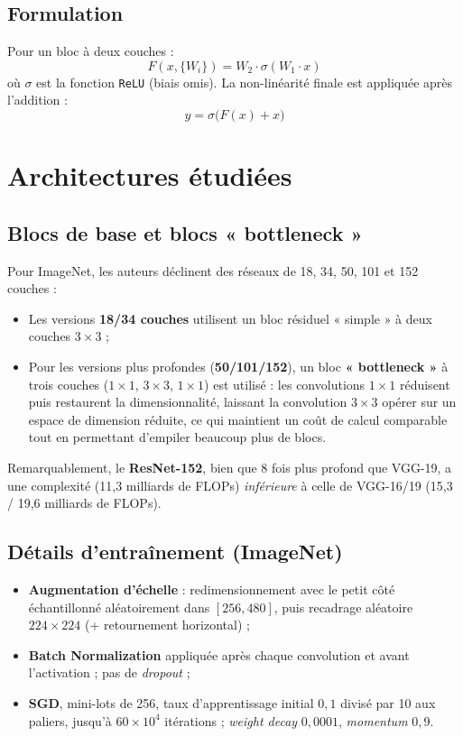 \documentclass[a4paper,11pt]{article}
\begin{document}
\subsection{Formulation}
Pour un bloc à deux couches :
$$F(x, \{W_i\}) = W_2 \cdot \sigma(W_1 \cdot x)$$
où $\sigma$ est la fonction \texttt{ReLU} (biais omis). La non-linéarité finale est appliquée après l'addition :
$$y = \sigma\big(F(x) + x\big)$$

\section{Architectures étudiées}

\subsection{Blocs de base et blocs « bottleneck »}
Pour ImageNet, les auteurs déclinent des réseaux de 18, 34, 50, 101 et 152 couches :
\begin{itemize}
    \item Les versions \textbf{18/34 couches} utilisent un bloc résiduel « simple » à deux couches $3\times 3$ ;
    \item Pour les versions plus profondes (\textbf{50/101/152}), un bloc \textbf{« bottleneck »} à trois couches ($1\times1$, $3\times3$, $1\times1$) est utilisé : les convolutions $1\times1$ réduisent puis restaurent la dimensionnalité, laissant la convolution $3\times3$ opérer sur un espace de dimension réduite, ce qui maintient un coût de calcul comparable tout en permettant d'empiler beaucoup plus de blocs.
\end{itemize}

Remarquablement, le \textbf{ResNet-152}, bien que 8 fois plus profond que VGG-19, a une complexité (11,3 milliards de FLOPs) \emph{inférieure} à celle de VGG-16/19 (15,3 / 19,6 milliards de FLOPs).

\subsection{Détails d'entraînement (ImageNet)}
\begin{itemize}
    \item \textbf{Augmentation d'échelle} : redimensionnement avec le petit côté échantillonné aléatoirement dans $[256, 480]$, puis recadrage aléatoire $224\times224$ (+ retournement horizontal) ;
    \item \textbf{Batch Normalization} appliquée après chaque convolution et avant l'activation ; pas de \emph{dropout} ;
    \item \textbf{SGD}, mini-lots de 256, taux d'apprentissage initial $0{,}1$ divisé par 10 aux paliers, jusqu'à $60\times10^4$ itérations ; \emph{weight decay} $0{,}0001$, \emph{momentum} $0{,}9$.
\end{itemize}
\end{document}
